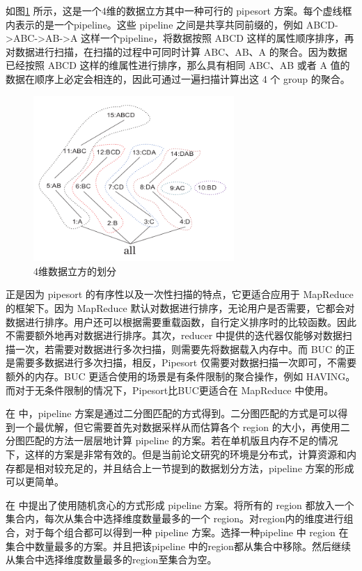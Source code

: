 如图\ref{pipesort} 所示，这是一个4维的数据立方其中一种可行的 pipesort 方案。每个虚线框内表示的是一个pipeline。这些 pipeline 之间是共享共同前缀的，例如 ABCD-\textgreater ABC-\textgreater AB-\textgreater A 这样一个pipeline，将数据按照 ABCD 这样的属性顺序排序，再对数据进行扫描，在扫描的过程中可同时计算 ABC、AB、A 的聚合。因为数据已经按照 ABCD 这样的维属性进行排序，那么具有相同 ABC、AB 或者 A 值的数据在顺序上必定会相连的，因此可通过一遍扫描计算出这 4 个 group 的聚合。

\begin{figure}[!htb]
\centering\includegraphics[width=3in]{picture/ch_terasort_mr/pipesort} 
\caption{4维数据立方的划分}\label{pipesort} 
\end{figure} 

正是因为 pipesort 的有序性以及一次性扫描的特点，它更适合应用于 MapReduce 的框架下。因为 MapReduce 默认对数据进行排序，无论用户是否需要，它都会对数据进行排序。用户还可以根据需要重载函数，自行定义排序时的比较函数。因此不需要额外地再对数据进行排序。其次，reducer 中提供的迭代器仅能够对数据扫描一次，若需要对数据进行多次扫描，则需要先将数据载入内存中。而 BUC 的正是需要多数据进行多次扫描，相反，Pipesort 仅需要对数据扫描一次即可，不需要额外的内存。BUC 更适合使用的场景是有条件限制的聚合操作，例如 HAVING。而对于无条件限制的情况下，Pipesort比BUC更适合在 MapReduce 中使用。

在 \cite{agarwal1996computation} 中，pipeline 方案是通过二分图匹配的方式得到。二分图匹配的方式是可以得到一个最优解，但它需要首先对数据采样从而估算各个 region 的大小，再使用二分图匹配的方法一层层地计算 pipeline 的方案。若在单机版且内存不足的情况下，这样的方案是非常有效的。但是当前论文研究的环境是分布式，计算资源和内存都是相对较充足的，并且结合上一节提到的数据划分方法，pipeline 方案的形成可以更简单。

在\cite{wang2013scalable} 中提出了使用随机贪心的方式形成 pipeline 方案。将所有的 region 都放入一个集合内，每次从集合中选择维度数量最多的一个 region。对region内的维度进行组合，对于每个组合都可以得到一种 pipeline 方案。选择一种pipeline 中 region 在集合中数量最多的方案。并且把该pipeline 中的region都从集合中移除。然后继续从集合中选择维度数量最多的region至集合为空。

